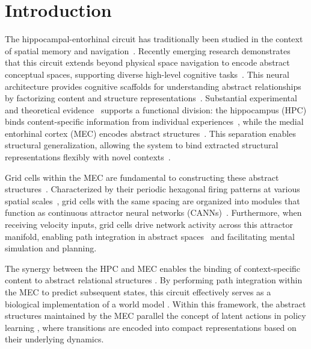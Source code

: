 \section{Introduction}
\label{Introduction}
The hippocampal-entorhinal circuit has traditionally been studied in the context of spatial memory and navigation~\citep{keefe1978hippocampus, hafting2005microstructure}. 
Recently emerging research demonstrates that this circuit extends beyond physical space navigation to encode abstract conceptual spaces, supporting diverse high-level cognitive tasks~\citep{behrens2018cognitive}.
This neural architecture provides cognitive scaffolds for understanding abstract relationships by factorizing content and structure representations~\citep{lerousseau2024space}. Substantial experimental and theoretical evidence~\citep{manns2006evolution, TolmanEichenbaumMachineUnifying2020} supports a functional division: the hippocampus (HPC) binds content-specific information from individual experiences~\citep{eichenbaum2017integration}, while the medial entorhinal cortex (MEC) encodes abstract structures~\citep{julian2018human, bao2019grid}. This separation enables structural generalization, allowing the system to bind extracted structural representations flexibly with novel contexts~\citep{doi:10.1073/pnas.0802631105}.

Grid cells within the MEC are fundamental to constructing these abstract structures~\citep{behrens2018cognitive}. Characterized by their periodic hexagonal firing patterns at various spatial scales~\citep{giocomo2011computational}, grid cells with the same spacing are organized into modules that function as continuous attractor neural networks (CANNs)~\citep{amari1977dynamics, ben1995theory, wu2008dynamics}. Furthermore, when receiving velocity inputs, grid cells drive network activity across this attractor manifold, enabling path integration in abstract spaces~\citep{burak2009accurate,gardnerToroidalTopologyPopulation2022} and facilitating mental simulation and planning.

The synergy between the HPC and MEC enables the binding of context-specific content to abstract relational structures \citep{TolmanEichenbaumMachineUnifying2020, chandraEpisodicAssociativeMemory2025}. By performing path integration within the MEC to predict subsequent states, this circuit effectively serves as a biological implementation of a world model \citep{haWorldModels2018, lecunPathAutonomousMachine}.
Within this framework, the abstract structures maintained by the MEC parallel the concept of latent actions in policy learning \citep{bruceGenieGenerativeInteractive2024, lapo}, where transitions are encoded into compact representations based on their underlying dynamics.

